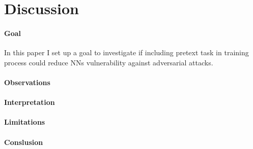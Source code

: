 \section{Discussion}

\paragraph{Goal}
In this paper I set up a goal to investigate if including pretext task in training process could reduce NNs
vulnerability against adversarial attacks.

\paragraph{Observations}

\paragraph{Interpretation}

\paragraph{Limitations}

\paragraph{Conslusion}

